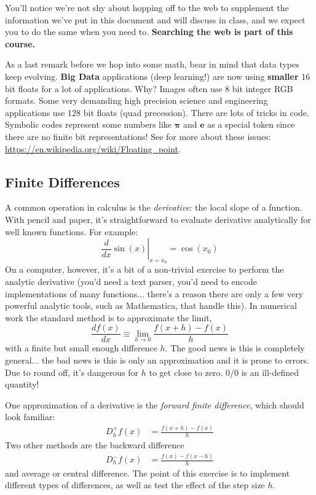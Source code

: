 \documentclass[pdftex,letterpaper,12pt]{article}
\newcommand\be{\begin{equation}}
\newcommand\ee{\end{equation}}
\newcommand{\<}{\langle}
\renewcommand{\>}{\rangle}
\begin{document}
You'll notice we're not shy about hopping off to the web to supplement the information
we've put in this document and will discuss in class, and we expect you to do the same
when you need to. {\bf Searching the web is part of this course.}

As a last remark before we hop into some math, bear in mind that data types keep evolving.
{\bf Big Data} applications (deep learning!) are now using {\bf smaller} 16 bit floats for a lot of applications. Why?  Images often
use 8 bit integer RGB formats. Some very demanding high precision science and
engineering applications use 128 bit floats (quad precession).  There are lots of
tricks in code. Symbolic codes represent some numbers like $\boldsymbol{\pi}$
and $\boldsymbol{e}$ as a  special token since there are no  finite bit representations!
See for more about these issues: \href{https://en.wikipedia.org/wiki/Floating\_point}{https://en.wikipedia.org/wiki/Floating\_point}.

\subsection{Finite Differences}

A common operation in calculus is the {\emph{derivative}}: the local
slope of a function. With pencil and paper, it's straightforward to
evaluate derivative analytically for well known functions. For example:
%
\be
\left. \frac{d}{dx} \sin(x) \right|_{x = x_0} = \cos(x_0)
\ee
%
On a computer, however, it's a bit of a non-trivial exercise to
perform the analytic derivative (you'd need a text parser, you'd need to encode
implementations of many functions... there's a reason there are only a
few very powerful analytic tools, such as Mathematica, that handle this). In numerical
work the standard method is to approximate the limit, 
\be
\frac{df(x)}{dx} \equiv \lim_{h \rightarrow 0} \frac{f(x+h)-f(x)}{h} 
\ee 
with a finite but small enough difference
$h$. The good news is this is completely general... the bad news is
this is only an approximation and it is prone to errors. Due to round off,
it's dangerous for $h$ to get close to zero. 0/0 is an ill-defined quantity!

One approximation of a derivative is the {\emph{forward finite difference}}, which
should look familiar:
%
\begin{align}
D^{+}_h f(x) &= \frac{f(x+h)-f(x)}{h}
\end{align}
%
Two other methods are the
backward difference 
%
\begin{align}
D^{-}_h f(x) &= \frac{f(x)-f(x-h)}{h}
\end{align}
%
and  average or central difference. The point of this
exercise is to implement different types of differences, as well as
test the effect of the step size $h$.
\end{document}
